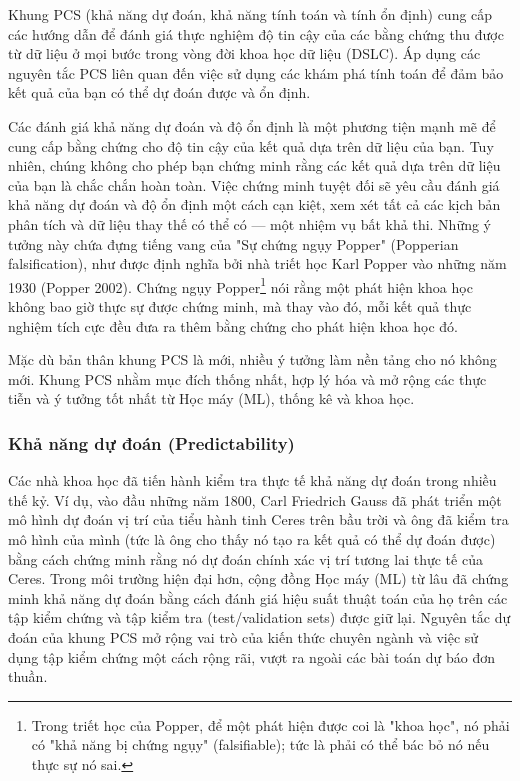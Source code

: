 \begin{tcolorbox}[title={Hộp 1.2: Khung PCS}]
Khung PCS (khả năng dự đoán, khả năng tính toán và tính ổn định) cung cấp các hướng dẫn để đánh giá thực nghiệm độ tin cậy của các bằng chứng thu được từ dữ liệu ở mọi bước trong vòng đời khoa học dữ liệu (DSLC). Áp dụng các nguyên tắc PCS liên quan đến việc sử dụng các khám phá tính toán để đảm bảo kết quả của bạn có thể dự đoán được và ổn định.
\end{tcolorbox}

Các đánh giá khả năng dự đoán và độ ổn định là một phương tiện mạnh mẽ để cung cấp bằng chứng cho độ tin cậy của kết quả dựa trên dữ liệu của bạn. Tuy nhiên, chúng không cho phép bạn chứng minh rằng các kết quả dựa trên dữ liệu của bạn là chắc chắn hoàn toàn. Việc chứng minh tuyệt đối sẽ yêu cầu đánh giá khả năng dự đoán và độ ổn định một cách cạn kiệt, xem xét tất cả các kịch bản phân tích và dữ liệu thay thế có thể có — một nhiệm vụ bất khả thi. Những ý tưởng này chứa đựng tiếng vang của "Sự chứng ngụy Popper" (Popperian falsification), như được định nghĩa bởi nhà triết học Karl Popper vào những năm 1930 (Popper 2002). Chứng ngụy Popper\footnote{Trong triết học của Popper, để một phát hiện được coi là "khoa học", nó phải có "khả năng bị chứng ngụy" (falsifiable); tức là phải có thể bác bỏ nó nếu thực sự nó sai.} nói rằng một phát hiện khoa học không bao giờ thực sự được chứng minh, mà thay vào đó, mỗi kết quả thực nghiệm tích cực đều đưa ra thêm bằng chứng cho phát hiện khoa học đó.

Mặc dù bản thân khung PCS là mới, nhiều ý tưởng làm nền tảng cho nó không mới. Khung PCS nhằm mục đích thống nhất, hợp lý hóa và mở rộng các thực tiễn và ý tưởng tốt nhất từ Học máy (ML), thống kê và khoa học.

\subsubsection{Khả năng dự đoán (Predictability)}
Các nhà khoa học đã tiến hành kiểm tra thực tế khả năng dự đoán trong nhiều thế kỷ. Ví dụ, vào đầu những năm 1800, Carl Friedrich Gauss đã phát triển một mô hình dự đoán vị trí của tiểu hành tinh Ceres trên bầu trời và ông đã kiểm tra mô hình của mình (tức là ông cho thấy nó tạo ra kết quả có thể dự đoán được) bằng cách chứng minh rằng nó dự đoán chính xác vị trí tương lai thực tế của Ceres. Trong môi trường hiện đại hơn, cộng đồng Học máy (ML) từ lâu đã chứng minh khả năng dự đoán bằng cách đánh giá hiệu suất thuật toán của họ trên các tập kiểm chứng và tập kiểm tra (test/validation sets) được giữ lại. Nguyên tắc dự đoán của khung PCS mở rộng vai trò của kiến thức chuyên ngành và việc sử dụng tập kiểm chứng một cách rộng rãi, vượt ra ngoài các bài toán dự báo đơn thuần.

